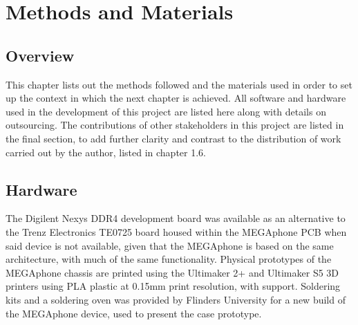 
\chapter{Methods and Materials} %

\label{Chapter3} %

\section{Overview}

This chapter lists out the methods followed and the materials used in order to set up the context in which the next chapter is achieved.
All software and hardware used in the development of this project are listed here along with details on outsourcing.
The contributions of other stakeholders in this project are listed in the final section, to add further clarity and contrast to the distribution of work carried out by the author, listed in chapter 1.6.

\section{Hardware}

The Digilent Nexys DDR4 development board was available as an alternative to the Trenz Electronics TE0725 board housed within the MEGAphone PCB when said device is not available, given that the MEGAphone is based on the same architecture, with much of the same functionality.
Physical prototypes of the MEGAphone chassis are printed using the Ultimaker 2+ and Ultimaker S5 3D printers using PLA plastic at 0.15mm print resolution, with support.
Soldering kits and a soldering oven was provided by Flinders University for a new build of the MEGAphone device, used to present the case prototype.

